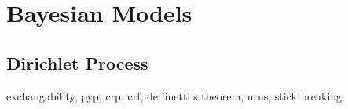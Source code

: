 \section{Bayesian Models}
\subsection{Dirichlet Process}

exchangability, pyp, crp, crf, de finetti's theorem, urns, stick breaking





